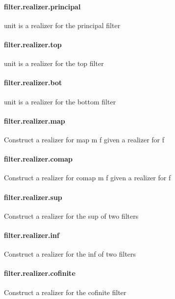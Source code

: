 \documentclass{article}
\begin{document}
\paragraph{filter.realizer.principal}
\par
\colorbox[RGB]{253,246,227}{{{{\color[RGB]{101, 123, 131} unit }}}} is a realizer for the principal filter
\paragraph{filter.realizer.top}
\par
\colorbox[RGB]{253,246,227}{{{{\color[RGB]{101, 123, 131} unit }}}} is a realizer for the top filter
\paragraph{filter.realizer.bot}
\par
\colorbox[RGB]{253,246,227}{{{{\color[RGB]{101, 123, 131} unit }}}} is a realizer for the bottom filter
\paragraph{filter.realizer.map}
\par
Construct a realizer for 
\colorbox[RGB]{253,246,227}{{{{\color[RGB]{101, 123, 131} map m f }}}} given a realizer for 
\colorbox[RGB]{253,246,227}{{{{\color[RGB]{101, 123, 131} f }}}}\paragraph{filter.realizer.comap}
\par
Construct a realizer for 
\colorbox[RGB]{253,246,227}{{{{\color[RGB]{101, 123, 131} comap m f }}}} given a realizer for 
\colorbox[RGB]{253,246,227}{{{{\color[RGB]{101, 123, 131} f }}}}\paragraph{filter.realizer.sup}
\par
Construct a realizer for the sup of two filters
\paragraph{filter.realizer.inf}
\par
Construct a realizer for the inf of two filters
\paragraph{filter.realizer.cofinite}
\par
Construct a realizer for the cofinite filter
\end{document}
